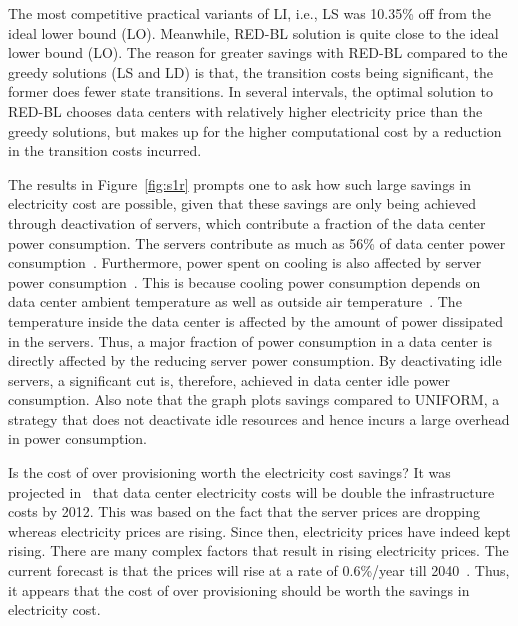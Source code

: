 The most competitive practical variants of LI, i.e., LS was 10.35\% off from the ideal lower bound (LO). Meanwhile, RED-BL solution is quite close to the ideal lower bound (LO). The reason for greater savings with RED-BL compared to the greedy solutions (LS and LD) is that, the transition costs being significant, the former does fewer state transitions. In several intervals, the optimal solution to RED-BL chooses data centers with relatively higher electricity price than the greedy solutions, but makes up for the higher computational cost by a reduction in the transition costs incurred.

The results in Figure~\ref{fig:s1r} prompts one to ask how such large savings in electricity cost are possible, given that these savings are only being achieved through deactivation of servers, which contribute a fraction of the data center power consumption. The servers contribute as much as 56\% of data center power consumption~\cite{Pelley:dcpower:weed:2009}. Furthermore, power spent on cooling is also affected by server power consumption~\cite{Pelley:dcpower:weed:2009}. This is because cooling power consumption depends on data center ambient temperature as well as outside air temperature~\cite{Pelley:dcpower:weed:2009}. The temperature inside the data center is affected by the amount of power dissipated in the servers. Thus, a major fraction of power consumption in a data center is directly affected by the reducing server power consumption. By deactivating idle servers, a significant cut is, therefore, achieved in data center idle power consumption. Also note that the graph plots savings compared to UNIFORM, a strategy that does not deactivate idle resources and hence incurs a large overhead in power consumption.

Is the cost of over provisioning worth the electricity cost savings? It was projected in~\cite{brill:DataCenterCrisis:UI:2007} that data center electricity costs will be double the infrastructure costs by 2012. This was based on the fact that the server prices are dropping whereas electricity prices are rising. Since then, electricity prices have indeed kept rising. There are many complex factors that result in rising electricity prices. The current forecast is that the prices will rise at a rate of 0.6\%/year till 2040~\cite{eiaannreport2015}. Thus, it appears that the cost of over provisioning should be worth the savings in electricity cost.

